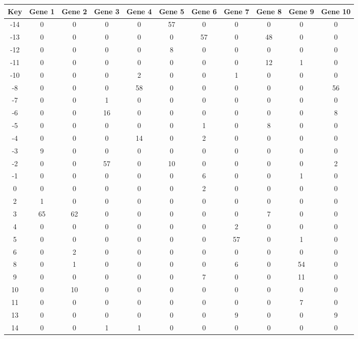 \begin{tabular}{|c|c|c|c|c|c|c|c|c|c|c|}
\hline
Key & Gene 1 & Gene 2 & Gene 3 & Gene 4 & Gene 5 & Gene 6 & Gene 7 & Gene 8 & Gene 9 & Gene 10 \\
\hline
-14 & 0 & 0 & 0 & 0 & 57 & 0 & 0 & 0 & 0 & 0 \\
-13 & 0 & 0 & 0 & 0 & 0 & 57 & 0 & 48 & 0 & 0 \\
-12 & 0 & 0 & 0 & 0 & 8 & 0 & 0 & 0 & 0 & 0 \\
-11 & 0 & 0 & 0 & 0 & 0 & 0 & 0 & 12 & 1 & 0 \\
-10 & 0 & 0 & 0 & 2 & 0 & 0 & 1 & 0 & 0 & 0 \\
-8 & 0 & 0 & 0 & 58 & 0 & 0 & 0 & 0 & 0 & 56 \\
-7 & 0 & 0 & 1 & 0 & 0 & 0 & 0 & 0 & 0 & 0 \\
-6 & 0 & 0 & 16 & 0 & 0 & 0 & 0 & 0 & 0 & 8 \\
-5 & 0 & 0 & 0 & 0 & 0 & 1 & 0 & 8 & 0 & 0 \\
-4 & 0 & 0 & 0 & 14 & 0 & 2 & 0 & 0 & 0 & 0 \\
-3 & 9 & 0 & 0 & 0 & 0 & 0 & 0 & 0 & 0 & 0 \\
-2 & 0 & 0 & 57 & 0 & 10 & 0 & 0 & 0 & 0 & 2 \\
-1 & 0 & 0 & 0 & 0 & 0 & 6 & 0 & 0 & 1 & 0 \\
0 & 0 & 0 & 0 & 0 & 0 & 2 & 0 & 0 & 0 & 0 \\
2 & 1 & 0 & 0 & 0 & 0 & 0 & 0 & 0 & 0 & 0 \\
3 & 65 & 62 & 0 & 0 & 0 & 0 & 0 & 7 & 0 & 0 \\
4 & 0 & 0 & 0 & 0 & 0 & 0 & 2 & 0 & 0 & 0 \\
5 & 0 & 0 & 0 & 0 & 0 & 0 & 57 & 0 & 1 & 0 \\
6 & 0 & 2 & 0 & 0 & 0 & 0 & 0 & 0 & 0 & 0 \\
8 & 0 & 1 & 0 & 0 & 0 & 0 & 6 & 0 & 54 & 0 \\
9 & 0 & 0 & 0 & 0 & 0 & 7 & 0 & 0 & 11 & 0 \\
10 & 0 & 10 & 0 & 0 & 0 & 0 & 0 & 0 & 0 & 0 \\
11 & 0 & 0 & 0 & 0 & 0 & 0 & 0 & 0 & 7 & 0 \\
13 & 0 & 0 & 0 & 0 & 0 & 0 & 9 & 0 & 0 & 9 \\
14 & 0 & 0 & 1 & 1 & 0 & 0 & 0 & 0 & 0 & 0 \\
\hline
\end{tabular}